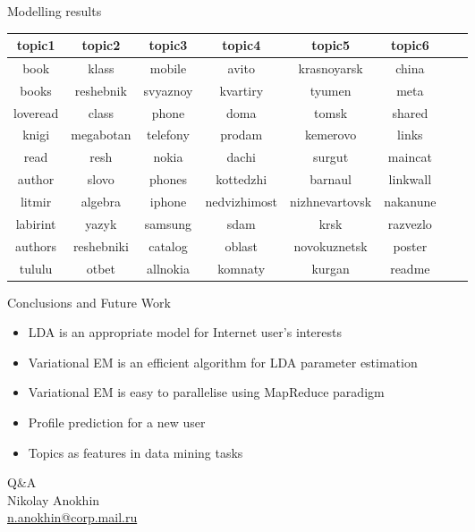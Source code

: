 \documentclass[aspectratio=1610]{beamer}
\begin{document}
\begin{frame}{Modelling results}

\begin{center}
\begin{tabular}{c c c c c c c c}
topic1 & topic2 & topic3 & topic4 & topic5 & topic6 \\
\hline
book & klass & mobile & avito & krasnoyarsk & china \\
books & reshebnik & svyaznoy & kvartiry & tyumen & meta \\
loveread & class & phone & doma & tomsk & shared \\
knigi & megabotan & telefony & prodam & kemerovo & links \\
read & resh & nokia & dachi & surgut & maincat \\
author & slovo & phones & kottedzhi & barnaul & linkwall \\
litmir & algebra & iphone & nedvizhimost & nizhnevartovsk & nakanune \\
labirint & yazyk & samsung & sdam & krsk & razvezlo \\
authors & reshebniki & catalog & oblast & novokuznetsk & poster \\
tululu & otbet & allnokia & komnaty & kurgan & readme
\end{tabular}
\end{center}

\end{frame}

\begin{frame}{Conclusions and Future Work}

\begin{itemize}
\item LDA is an appropriate model for Internet user's interests
\item Variational EM is an efficient algorithm for LDA parameter estimation
\item Variational EM is easy to parallelise using MapReduce paradigm
\end{itemize}

\vspace{1em}
\begin{itemize}
\item Profile prediction for a new user
\item Topics as features in data mining tasks
\end{itemize}

\end{frame}

\begin{frame}

\begin{center}
{\Huge\color{mailorange}Q\&A} \\
Nikolay Anokhin \\
\href{mailto:n.anokhin@corp.mail.ru}{n.anokhin@corp.mail.ru}
\end{center}

\end{frame}
\end{document}

